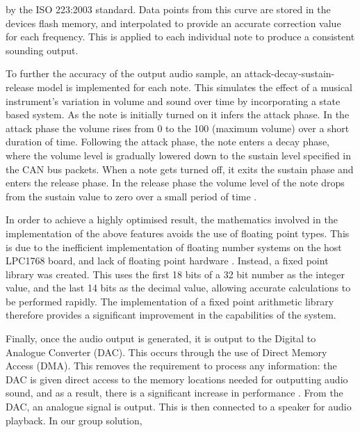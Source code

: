 by the ISO 223:2003 standard. %
Data points from this curve are stored in the devices flash memory, and 
interpolated to provide an accurate correction value for each frequency. This is 
applied to each individual note to produce a consistent sounding output. 
\par\bigskip\noindent
To further the accuracy of the output audio sample, an attack-decay-sustain-release 
model is implemented for each note. This simulates the effect of a musical 
instrument's variation in volume and sound over time by incorporating a state 
based system. As the note is initially turned on it infers the attack phase. 
In the attack phase the volume rises from 0 to the 100 (maximum volume) over a 
short duration of time.
Following the attack phase, the note enters a decay phase, where the volume level 
is gradually lowered down to the sustain level specified in the CAN bus packets. 
When a note gets turned off, it exits the sustain phase and enters the release phase. 
In the release phase the volume level of the note drops from the sustain value to 
zero over a small period of time \cite{asr-book}. 
\par\bigskip\noindent
In order to achieve a highly optimised result, the mathematics involved in the 
implementation of the above features avoids the use of floating point types. 
This is due to the inefficient implementation of floating number systems on the 
host LPC1768 board, and lack of floating point hardware 
\cite{kormanyos2013real, lpc1768-datasheet}.
Instead, a fixed point library was created. This uses the first 18 bits of a 
32 bit number as the integer value, and the last 14 bits as the decimal value, 
allowing accurate calculations to be performed rapidly. 
The implementation of a fixed point arithmetic library therefore provides a 
significant improvement in the capabilities of the system. 
\par\bigskip\noindent
Finally, once the audio output is generated, it is output to the Digital to 
Analogue Converter (DAC). This occurs through the use of Direct Memory Access (DMA).
This removes the requirement to process any information: the DAC is given 
direct access to the memory locations needed for outputting audio sound, and as 
a result, there is a significant increase in performance 
\cite{barr1999programming}. From the DAC, an analogue signal is output. This is 
then connected to a speaker for audio playback. 
In our group solution, %

